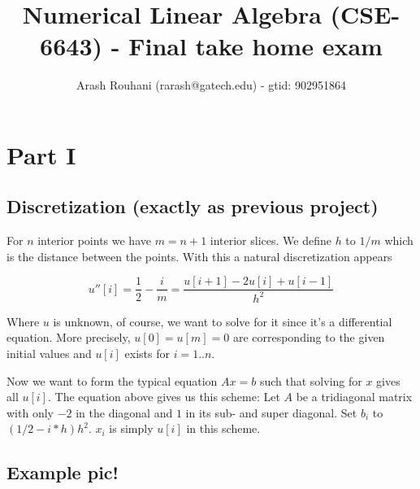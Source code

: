 \documentclass[a4paper,11pt]{article}
\title{Numerical Linear Algebra (CSE-6643) - Final take home exam}
\author{Arash Rouhani (rarash@gatech.edu) - gtid: 902951864}
\begin{document}
\maketitle

\section{Part I}


\subsection{Discretization (exactly as previous project)}

For $n$ interior points we have $m=n+1$ interior slices. We define $h$
to $1/m$ which is the distance between the points. With this a natural
discretization appears

\[
  u''[i] = \frac{1}{2} - \frac{i}{m} = \frac{u[i+1]-2u[i]+u[i-1]}{h^2}
\]

Where $u$ is unknown, of course, we want to solve for it since it's a
differential equation. More precisely, $u[0]=u[m]=0$ are corresponding
to the given initial values and $u[i]$ exists for $i = 1..n$.

Now we want to form the typical equation $Ax=b$ such that solving for
$x$ gives all $u[i]$. The equation above gives us this scheme: Let $A$
be a tridiagonal matrix with only $-2$ in the diagonal and $1$ in its
sub- and super diagonal. Set $b_i$ to $(1/2-i*h)h^2$. $x_i$ is simply
$u[i]$ in this scheme.

\subsection{Example pic!}
\end{document}
